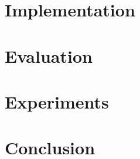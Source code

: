 \documentclass[a4paper,11pt,oneside]{report}
\begin{document}



\chapter{Implementation}  \label{chatper:implementation}




\chapter{Evaluation}  \label{chatper:evaluation}



\chapter{Experiments}



\chapter{Conclusion}





\cleardoublepage
{}
{}
\printbibliography



%
%
\end{document}
